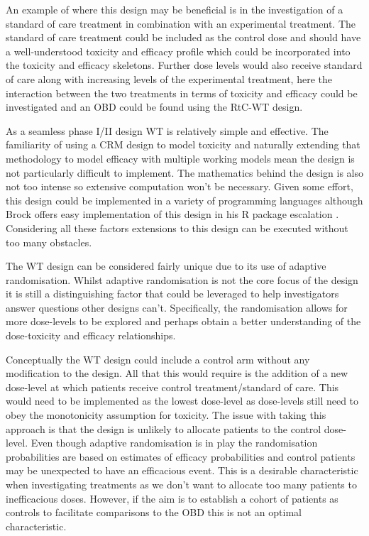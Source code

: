 An example of where this design may be beneficial is in the investigation of a standard of care treatment in combination with an experimental treatment. The standard of care treatment could be included as the control dose and should have a well-understood toxicity and efficacy profile which could be incorporated into the toxicity and efficacy skeletons. Further dose levels would also receive standard of care along with increasing levels of the experimental treatment, here the interaction between the two treatments in terms of toxicity and efficacy could be investigated and an OBD could be found using the RtC-WT design. 

As a seamless phase \RN{1}/\RN{2} design WT is relatively simple and effective. The familiarity of using a CRM design to model toxicity and naturally extending that methodology to model efficacy with multiple working models mean the design is not particularly difficult to implement. The mathematics behind the design is also not too intense so extensive computation won't be necessary. Given some effort, this design could be implemented in a variety of programming languages although Brock offers easy implementation of this design in his R package escalation \cite{brockModularApproachDose2020}. Considering all these factors extensions to this design can be executed without too many obstacles.

The WT design can be considered fairly unique due to its use of adaptive randomisation. Whilst adaptive randomisation is not the core focus of the design it is still a distinguishing factor that could be leveraged to help investigators answer questions other designs can't. Specifically, the randomisation allows for more dose-levels to be explored and perhaps obtain a better understanding of the dose-toxicity and efficacy relationships. 

Conceptually the WT design could include a control arm without any modification to the design. All that this would require is the addition of a new dose-level at which patients receive control treatment/standard of care. This would need to be implemented as the lowest dose-level as dose-levels still need to obey the monotonicity assumption for toxicity. The issue with taking this approach is that the design is unlikely to allocate patients to the control dose-level. Even though adaptive randomisation is in play the randomisation probabilities are based on estimates of efficacy probabilities and control patients may be unexpected to have an efficacious event. This is a desirable characteristic when investigating treatments as we don't want to allocate too many patients to inefficacious doses. However, if the aim is to establish a cohort of patients as controls to facilitate comparisons to the OBD this is not an optimal characteristic. 


